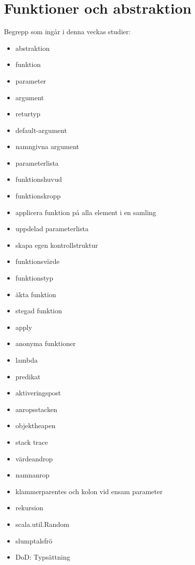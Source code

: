 \chapter{Funktioner och abstraktion}\label{chapter:W03}
Begrepp som ingår i denna veckas studier:
\begin{multicols}{2}\begin{itemize}[noitemsep,label={$\square$},leftmargin=*]
\item abstraktion
\item funktion
\item parameter
\item argument
\item returtyp
\item default-argument
\item namngivna argument
\item parameterlista
\item funktionshuvud
\item funktionskropp
\item applicera funktion på alla element i en samling
\item uppdelad parameterlista
\item skapa egen kontrollstruktur
\item funktionsvärde
\item funktionstyp
\item äkta funktion
\item stegad funktion
\item apply
\item anonyma funktioner
\item lambda
\item predikat
\item aktiveringspost
\item anropsstacken
\item objektheapen
\item stack trace
\item värdeandrop
\item namnanrop
\item klammerparentes och kolon vid ensam parameter
\item rekursion
\item scala.util.Random
\item slumptalsfrö
\item DoD: Typsättning\end{itemize}\end{multicols}
